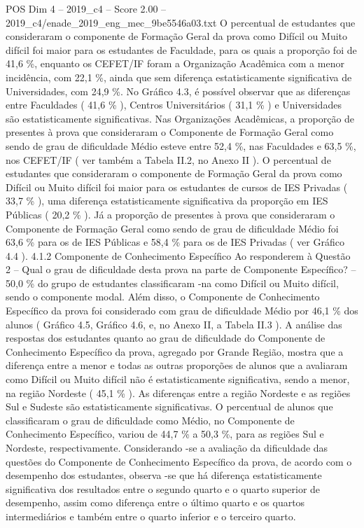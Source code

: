 \begin{textsample}{POS Dim 4 – 2019\_c4 – Score 2.00 – 2019\_c4/enade\_2019\_eng\_mec\_9be5546a03.txt}
O percentual de estudantes que consideraram o componente de Formação Geral da prova como Difícil ou Muito difícil foi maior para os estudantes de Faculdade, para os quais a proporção foi de 41,6 \%, enquanto os CEFET/IF foram a Organização Acadêmica com a menor incidência, com 22,1 \%, ainda que sem diferença estatisticamente significativa de Universidades, com 24,9 \%.
No Gráfico 4.3, é possível observar que as diferenças entre Faculdades ( 41,6 \% ), Centros Universitários ( 31,1 \% ) e Universidades são estatisticamente significativas.
Nas Organizações Acadêmicas, a proporção de presentes à prova que consideraram o Componente de Formação Geral como sendo de grau de dificuldade Médio esteve entre 52,4 \%, nas Faculdades e 63,5 \%, nos CEFET/IF ( ver também a Tabela II.2, no Anexo II ).
O percentual de estudantes que consideraram o componente de Formação Geral da prova como Difícil ou Muito difícil foi maior para os estudantes de cursos de IES Privadas ( 33,7 \% ), uma diferença estatisticamente significativa da proporção em IES Públicas ( 20,2 \% ).
Já a proporção de presentes à prova que consideraram o Componente de Formação Geral como sendo de grau de dificuldade Médio foi 63,6 \% para os de IES Públicas e 58,4 \% para os de IES Privadas ( ver Gráfico 4.4 ). 4.1.2 Componente de Conhecimento Específico Ao responderem à Questão 2 – Qual o grau de dificuldade desta prova na parte de Componente Específico? – 50,0 \% do grupo de estudantes classificaram -na como Difícil ou Muito difícil, sendo o componente modal.
Além disso, o Componente de Conhecimento Específico da prova foi considerado com grau de dificuldade Médio por 46,1 \% dos alunos ( Gráfico 4.5, Gráfico 4.6, e, no Anexo II, a Tabela II.3 ).
A análise das respostas dos estudantes quanto ao grau de dificuldade do Componente de Conhecimento Específico da prova, agregado por Grande Região, mostra que a diferença entre a menor e todas as outras proporções de alunos que a avaliaram como Difícil ou Muito difícil não é estatisticamente significativa, sendo a menor, na região Nordeste ( 45,1 \% ).
As diferenças entre a região Nordeste e as regiões Sul e Sudeste são estatisticamente significativas.
O percentual de alunos que classificaram o grau de dificuldade como Médio, no Componente de Conhecimento Específico, variou de 44,7 \% a 50,3 \%, para as regiões Sul e Nordeste, respectivamente.
Considerando -se a avaliação da dificuldade das questões do Componente de Conhecimento Específico da prova, de acordo com o desempenho dos estudantes, observa -se que há diferença estatisticamente significativa dos resultados entre o segundo quarto e o quarto superior de desempenho, assim como diferença entre o último quarto e os quartos intermediários e também entre o quarto inferior e o terceiro quarto.

\end{textsample}
